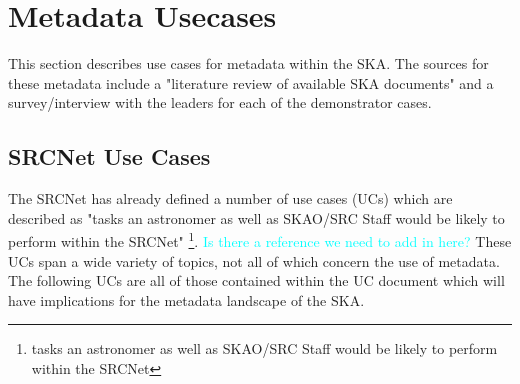 \section{Metadata Usecases}\label{sec:reqs}

This section describes use cases for metadata within the SKA.
The sources for these metadata include a "literature review of available SKA documents" and a survey/interview with the leaders for each of the demonstrator cases. 

\subsection{SRCNet Use Cases}

The SRCNet has already defined a number of use cases (UCs) which are described as "tasks an astronomer as well as SKAO/SRC Staff would be likely to perform within the
SRCNet" \footnote{tasks an astronomer as well as SKAO/SRC Staff would be likely to perform within the SRCNet}. \textcolor{cyan}{Is there a reference we need to add in here?}
These UCs span a wide variety of topics, not all of which concern the use of metadata.
The following UCs are all of those contained within the UC document which will have implications for the metadata landscape of the SKA. 
\\
